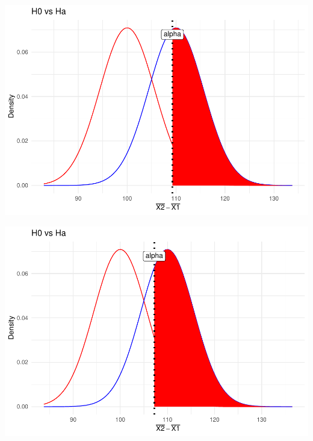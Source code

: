 \documentclass[]{article}
\newenvironment{Shaded}{\begin{snugshade}}{\end{snugshade}}
\newcommand{\FunctionTok}[1]{\textcolor[rgb]{0.00,0.00,0.00}{#1}}
\newcommand{\NormalTok}[1]{#1}
\newcommand{\SpecialCharTok}[1]{\textcolor[rgb]{0.00,0.00,0.00}{#1}}
\begin{document}
\begin{Shaded}
\end{Shaded}

\includegraphics{Enunciado_Tarea_3_files/figure-latex/unnamed-chunk-4-2.pdf}

\begin{Shaded}
\end{Shaded}

\includegraphics{Enunciado_Tarea_3_files/figure-latex/unnamed-chunk-4-3.pdf}
\end{document}
